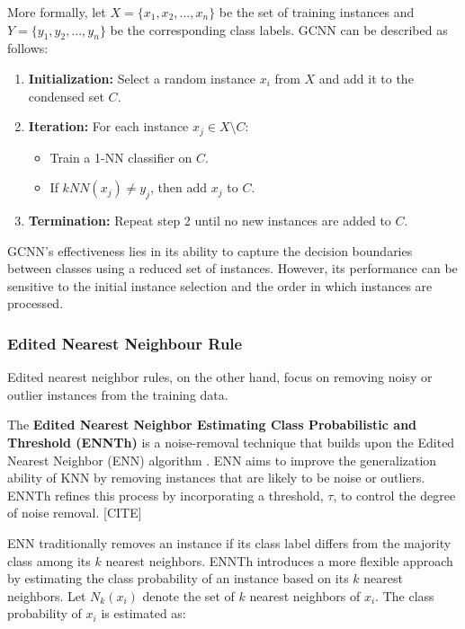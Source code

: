 More formally, let $X = \{x_1, x_2, ..., x_n\}$ be the set of training instances and $Y = \{y_1, y_2, ..., y_n\}$ be 
the corresponding class labels. GCNN can be described as follows:

\begin{enumerate}
    \item \textbf{Initialization:} Select a random instance $x_i$ from $X$ and add it to the condensed set $C$.
    \item \textbf{Iteration:} For each instance $x_j \in X \setminus C$:
    \begin{itemize}
        \item Train a 1-NN classifier on $C$.
        \item If $kNN(x_j) \neq y_j$, then add $x_j$ to $C$.
    \end{itemize}
    \item \textbf{Termination:} Repeat step 2 until no new instances are added to $C$.
\end{enumerate}

GCNN's effectiveness lies in its ability to capture the decision boundaries between classes using a reduced 
set of instances. However, its performance can be sensitive to the initial instance selection and the order 
in which instances are processed.



\subsubsection*{Edited Nearest Neighbour Rule}
Edited nearest neighbor rules, on the other hand, focus on removing noisy or outlier 
instances from the training data. 

The \textbf{Edited Nearest Neighbor Estimating Class Probabilistic and Threshold (ENNTh)} is a noise-removal technique that builds upon the Edited Nearest Neighbor (ENN) algorithm \cite{wilson2000reduction}. ENN aims to improve the generalization ability of KNN by removing instances that are likely to be noise or outliers. ENNTh refines this process by incorporating a threshold, $\tau$, to control the degree of noise removal. [CITE]

ENN traditionally removes an instance if its class label differs from the majority class among its $k$ nearest neighbors. ENNTh introduces a more flexible approach by estimating the class probability of an instance based on its $k$ nearest neighbors. Let $N_k(x_i)$ denote the set of $k$ nearest neighbors of $x_i$. The class probability of $x_i$ is estimated as:


